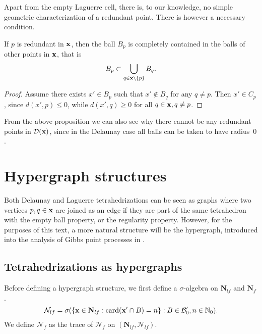 Apart from the empty Laguerre cell, there is, to our knowledge, no simple geometric characterization of a redundant point. There is however a necessary condition.

\begin{proposition}
	If $p$ is redundant in ${\mathbf{x}}$, then the ball $B_p$ is completely contained in the balls of other points in ${\mathbf{x}}$, that is 
	$$B_p \subset \bigcup_{q \in {\mathbf{x}}\setminus \{p\}} B_q.$$
\end{proposition}
\begin{proof}
	Assume there exists $x' \in B_p$ such that $x' \notin B_q$ for any $q\neq p$. Then $x' \in C_p$, since $d(x', p) \leq 0$, while $d(x',q) \geq 0$ for all $q\in {\mathbf{x}}, q\neq p$.
\end{proof}



From the above proposition we can also see why there cannot be any redundant points in $\mathcal D({\mathbf{x}})$, since in the Delaunay case all balls can be taken to have radius~$0$.


\section{Hypergraph structures}\label{sec:hypergraphs}
Both Delaunay and Laguerre tetrahedrizations can be seen as graphs where two vertices $p,q\in{\mathbf{x}}$ are joined as an edge if they are part of the same tetrahedron with the empty ball property, or the regularity property. However, for the purposes of this text, a more natural structure will be the hypergraph, introduced into the analysis of Gibbs point processes in \cite{DDG12}.

\subsection{Tetrahedrizations as hypergraphs}\label{sec:tetrahyper}
Before defining a hypergraph structure, we first define a $\sigma$-algebra on $\mathbf N_{lf}$ and $\mathbf N_{f}$. 
$$\mathcal N_{lf}=\sigma(\{{\mathbf{x}} \in \mathbf N_{lf}: \mathrm{card}({\mathbf{x}}'\cap B)=n\}: B \in \mathcal B_0', n\in \mathbb N_0).$$
We define $\mathcal N_{f}$ as the trace of $\mathcal N_f$ on $(\mathbf N_{lf}, \mathcal N_{lf})$.
 
